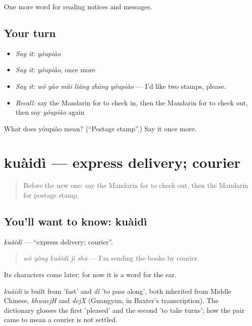 \begin{grammarlens}[title={What you've built}]
One more word for reading notices and messages.
\end{grammarlens}

\subsection*{Your turn}
\begin{itemize}
\raggedright
  \item \emph{Say it:} \emph{yóupiào}
  \item \emph{Say it:} \emph{yóupiào}, once more
  \item \emph{Say it:} \emph{wǒ yào mǎi liǎng zhāng yóupiào} — I'd like two stamps, please.
  \item \emph{Recall:} say the Mandarin for to check in, then the Mandarin for to check out, then say \emph{yóupiào} again
\end{itemize}

\begin{tcolorbox}[breakable,colback=teal!4,colframe=teal!35!black,title={Before you move on}]
What does yóupiào mean? (\textquotedblleft{}Postage stamp\textquotedblright{}.) Say it once more.
\end{tcolorbox}
\section[kuàidì]{kuàidì — express delivery; courier}

\label{lesson:ZH-C201-kuaidi}



\begin{quote}
Before the new one: say the Mandarin for to check out, then the Mandarin for postage stamp.
\end{quote}

\subsection*{You'll want to know: kuàidì}
\emph{kuàidì} — \textquotedblleft{}express delivery; courier\textquotedblright{}.

\begin{quote}
\emph{wǒ yòng kuàidì jì shū} — I'm sending the books by courier.
\end{quote}

Its characters come later; for now it is a word for the ear.

\begin{cousinweb}
\emph{kuàidì} is built from  'fast' and \emph{dì} 'to pass along', both inherited from Middle Chinese, \emph{khwaejH} and \emph{dejX} (Guangyun, in Baxter's transcription). The dictionary glosses the first 'pleased' and the second 'to take turns'; how the pair came to mean a courier is not settled.
\end{cousinweb}


